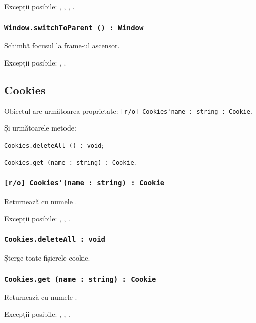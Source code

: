 Excepții posibile: , , , .

\subsubsection{\lstinline|Window.switchToParent () : Window|}

Schimbă focusul la frame-ul ascensor.

Excepții posibile: , .

\subsection{{\color{orange} Cookies}}

Obiectul \cookies{} are următoarea proprietate: \lstinline|[r/o] Cookies'name : string : Cookie|.

Și următoarele metode: 
\begin{icItems}
	\item \lstinline|Cookies.deleteAll () : void|;
	\item \lstinline|Cookies.get (name : string) : Cookie|.
\end{icItems}

\subsubsection{\lstinline|[r/o] Cookies'(name : string) : Cookie|}

Returnează \cookie{} cu numele .

Excepții posibile: , , .

\subsubsection{\lstinline|Cookies.deleteAll : void|}

Șterge toate fișierele cookie.

\subsubsection{\lstinline|Cookies.get (name : string) : Cookie|}

Returnează \cookie{} cu numele .

Excepții posibile: , , .

